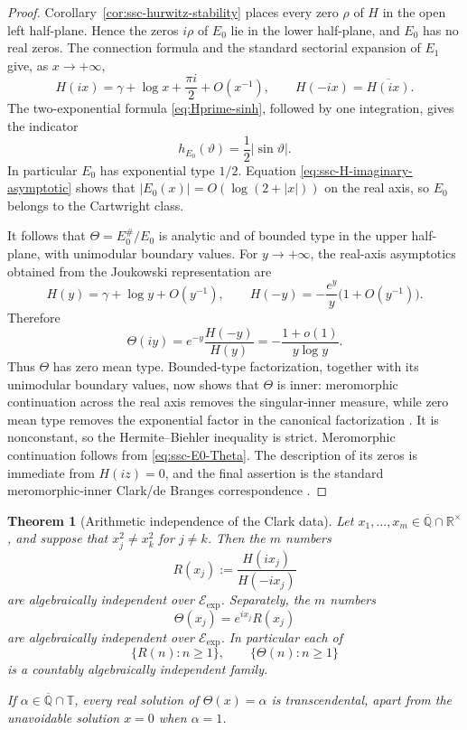 \documentclass[11pt]{article}
\newtheorem{theorem}{Theorem}[section]
\theoremstyle{definition}
\theoremstyle{remark}
\newcommand{\Qbar}{\overline{\mathbb Q}}
\newcommand{\Eexp}{\mathcal E_{\mathrm{exp}}}
\begin{document}
\begin{proof}
Corollary~\ref{cor:ssc-hurwitz-stability} places every zero \(\rho\) of
\(H\) in the open left half-plane.  Hence the zeros \(i\rho\) of \(E_0\)
lie in the lower half-plane, and \(E_0\) has no real zeros.  The connection
formula and the standard sectorial expansion of \(E_1\) give, as
\(x\to+\infty\),
\begin{equation}\label{eq:ssc-H-imaginary-asymptotic}
 H(ix)=\gamma+\log x+\frac{\pi i}{2}+O(x^{-1}),
 \qquad H(-ix)=\overline{H(ix)}.
\end{equation}
The two-exponential formula \eqref{eq:Hprime-sinh}, followed by one
integration, gives the indicator
\[
 h_{E_0}(\vartheta)=\frac12|\sin\vartheta|.
\]
In particular \(E_0\) has exponential type \(1/2\).  Equation
\eqref{eq:ssc-H-imaginary-asymptotic} shows that
\(|E_0(x)|=O(\log(2+|x|))\) on the real axis, so \(E_0\) belongs to the
Cartwright class.

It follows that \(\Theta=E_0^\#/E_0\) is analytic and of bounded type in
the upper half-plane, with unimodular boundary values.  For
\(y\to+\infty\), the real-axis asymptotics obtained from the Joukowski
representation are
\[
 H(y)=\gamma+\log y+O(y^{-1}),\qquad
 H(-y)=-\frac{e^y}{y}\bigl(1+O(y^{-1})\bigr).
\]
Therefore
\begin{equation}\label{eq:ssc-Theta-mean-type}
 \Theta(iy)=e^{-y}\frac{H(-y)}{H(y)}
 =-\frac{1+o(1)}{y\log y}.
\end{equation}
Thus \(\Theta\) has zero mean type.  Bounded-type factorization, together
with its unimodular boundary values, now shows that \(\Theta\) is inner:
meromorphic continuation across the real axis removes the singular-inner
measure, while zero mean type removes the exponential factor in the
canonical factorization \cite{deBranges1968,Clark1972}.  It is nonconstant,
so the Hermite--Biehler inequality is strict.
Meromorphic continuation follows from \eqref{eq:ssc-E0-Theta}.  The
description of its zeros is immediate from \(H(iz)=0\), and the final
assertion is the standard meromorphic-inner Clark/de Branges
correspondence \cite{Clark1972,deBranges1968}.
\end{proof}

\begin{theorem}[Arithmetic independence of the Clark data]
\label{thm:ssc-arithmetic-Clark}
Let \(x_1,\ldots,x_m\in\Qbar\cap\mathbb R^\times\), and suppose that
\(x_j^2\ne x_k^2\) for \(j\ne k\).  Then the \(m\) numbers
\[
 R(x_j):=\frac{H(ix_j)}{H(-ix_j)}
\]
are algebraically independent over \(\Eexp\).  Separately, the \(m\)
numbers
\[
 \Theta(x_j)=e^{ix_j}R(x_j)
\]
are algebraically independent over \(\Eexp\).  In particular each of
\[
 \{R(n):n\geq1\},\qquad \{\Theta(n):n\geq1\}
\]
is a countably algebraically independent family.

If \(\alpha\in\Qbar\cap\mathbb T\), every real solution of
\(\Theta(x)=\alpha\) is transcendental, apart from the unavoidable
solution \(x=0\) when \(\alpha=1\).
\end{theorem}
\end{document}
